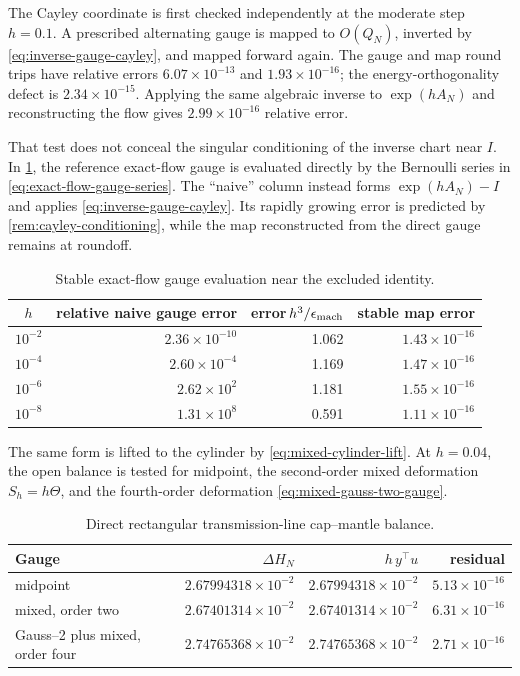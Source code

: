 \documentclass[11pt,a4paper]{article}
\begin{document}
The Cayley coordinate is first checked independently at the moderate step
\(h=0.1\).  A prescribed alternating gauge is mapped to \(O(Q_N)\),
inverted by \cref{eq:inverse-gauge-cayley}, and mapped forward again.  The
gauge and map round trips have relative errors \(6.07\times10^{-13}\)
and \(1.93\times10^{-16}\); the energy-orthogonality defect is
\(2.34\times10^{-15}\).  Applying the same algebraic inverse to
\(\exp(hA_N)\) and reconstructing the flow gives
\(2.99\times10^{-16}\) relative error.

That test does not conceal the singular conditioning of the inverse chart
near \(I\).  In \cref{tab:cayley-conditioning}, the reference exact-flow
gauge is evaluated directly by the Bernoulli series in
\cref{eq:exact-flow-gauge-series}.  The ``naive'' column instead forms
\(\exp(hA_N)-I\) and applies \cref{eq:inverse-gauge-cayley}.  Its rapidly
growing error is predicted by \cref{rem:cayley-conditioning}, while the
map reconstructed from the direct gauge remains at roundoff.

\begin{table}[htbp]
\centering
\caption{Stable exact-flow gauge evaluation near the excluded identity.}
\label{tab:cayley-conditioning}
\begin{tabular}{@{}crrr@{}}
\toprule
\(h\) & relative naive gauge error
& error\(\,h^3/\epsilon_{\rm mach}\) & stable map error \\ \midrule
\(10^{-2}\) & \(2.36\times10^{-10}\) & 1.062 & \(1.43\times10^{-16}\)\\
\(10^{-4}\) & \(2.60\times10^{-4}\) & 1.169 & \(1.47\times10^{-16}\)\\
\(10^{-6}\) & \(2.62\times10^{2}\) & 1.181 & \(1.55\times10^{-16}\)\\
\(10^{-8}\) & \(1.31\times10^{8}\) & 0.591 & \(1.11\times10^{-16}\)\\
\bottomrule
\end{tabular}
\end{table}

The same form is lifted to the cylinder by
\cref{eq:mixed-cylinder-lift}.  At \(h=0.04\), the open
balance is tested for midpoint, the second-order mixed deformation
\(S_h=h\Theta\), and the fourth-order deformation
\cref{eq:mixed-gauss-two-gauge}.

\begin{table}[htbp]
\centering
\caption{Direct rectangular transmission-line cap--mantle balance.}
\label{tab:rectangular-line-power}
\begin{tabular}{@{}lrrr@{}}
\toprule
Gauge & \(\Delta H_N\) & \(h\,y^\top u\) & residual \\ \midrule
midpoint
& \(2.67994318\times10^{-2}\)
& \(2.67994318\times10^{-2}\)
& \(5.13\times10^{-16}\) \\
mixed, order two
& \(2.67401314\times10^{-2}\)
& \(2.67401314\times10^{-2}\)
& \(6.31\times10^{-16}\) \\
Gauss--2 plus mixed, order four
& \(2.74765368\times10^{-2}\)
& \(2.74765368\times10^{-2}\)
& \(2.71\times10^{-16}\) \\
\bottomrule
\end{tabular}
\end{table}
\end{document}
